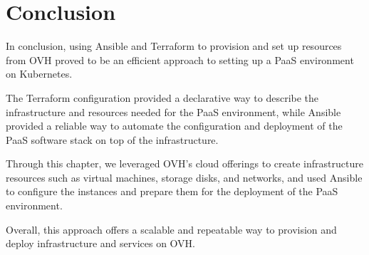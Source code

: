 \section*{Conclusion}

In conclusion, using Ansible and Terraform to provision and set up resources from OVH proved to be an efficient approach to setting up a PaaS environment on Kubernetes.  

The Terraform configuration provided a declarative way to describe the infrastructure and resources needed for the PaaS environment, while Ansible provided a reliable way to automate the configuration and deployment of the PaaS software stack on top of the infrastructure. 

Through this chapter, we leveraged OVH's cloud offerings to create infrastructure resources such as virtual machines, storage disks, and networks, and used Ansible to configure the instances and prepare them for the deployment of the PaaS environment. 

Overall, this approach offers a scalable and repeatable way to provision and deploy infrastructure and services on OVH.
